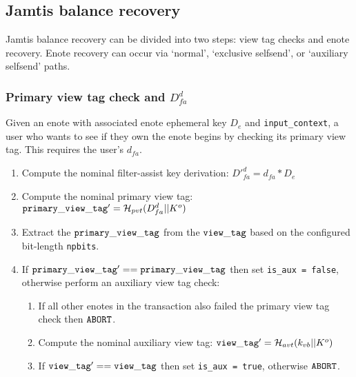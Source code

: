 \subsection{Jamtis balance recovery}
\label{subsec:jamtis-balance-recovery}

Jamtis balance recovery can be divided into two steps: view tag checks and enote recovery. Enote recovery can occur via `normal', `exclusive selfsend', or `auxiliary selfsend' paths.

\subsubsection{Primary view tag check and $D^d_{fa}$}
\label{subsubsec:jamtis-balance-recovery-view-tag-primary}

Given an enote with associated enote ephemeral key $D_e$ and {\tt input\_context}, a user who wants to see if they own the enote begins by checking its primary view tag. This requires the user's $d_{fa}$.

\begin{enumerate}
    \item Compute the nominal filter-assist key derivation: $D'^d_{fa} = d_{fa} * D_e$

    \item Compute the nominal primary view tag: ${\tt primary\_view\_tag'} = \mathcal{H}_{pvt}(D^d_{fa} || K^o)$
    
    \item Extract the ${\tt primary\_view\_tag}$ from the ${\tt view\_tag}$ based on the configured bit-length {\tt npbits}.

    \item If ${\tt primary\_view\_tag}' == {\tt primary\_view\_tag}$ then set {\tt is\_aux = false}, otherwise perform an auxiliary view tag check:

    \begin{enumerate}
        \item If all other enotes in the transaction also failed the primary view tag check then ${\tt ABORT}$.

        \item Compute the nominal auxiliary view tag: ${\tt view\_tag'} = \mathcal{H}_{avt}(k_{vb} || K^o)$
        
        \item If ${\tt view\_tag'} == {\tt view\_tag}$ then set {\tt is\_aux = true}, otherwise ${\tt ABORT}$.
    \end{enumerate}
\end{enumerate}

